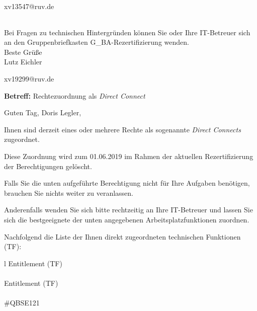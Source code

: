 \documentclass[a4paper,landscape,12pt]{letter}
\begin{document}
\begin{letter}{xv13547@ruv.de\hfill \break}
\begin{tiny}
\begin{longtable}{|p{35mm}|p{15mm}|p{25mm}|p{10mm}|p{40mm}|p{50mm}|p{50mm}|}
\hline
		\end{longtable}
		\end{tiny}
	
\begin{minipage}{\textwidth}
			Bei Fragen zu technischen Hintergründen können Sie 
			oder Ihre IT-Betreuer sich an den Gruppenbriefkasten 
			G\_BA-Rezertifizierung
			wenden.\\
			\linebreak
			Beste Grüße\\
			Lutz Eichler
	\end{minipage}
	\end{letter}
	
\begin{letter}{xv19299@ruv.de\hfill \break}
\begin{normalsize}
	\opening{\textbf{Betreff:} Rechtezuordnung als \emph{Direct Connect}}
	\begin{normalsize} \hfill
	\end{normalsize}

	\begin{normalsize}
		Guten Tag, 
	Doris Legler, \hfill \break
	\end{normalsize}
	\end{normalsize}
	
\begin{normalsize}
	Ihnen sind derzeit eines oder mehrere Rechte als sogenannte \emph{Direct Connects} zugeordnet.
	
	Diese Zuordnung wird zum 01.06.2019 im Rahmen der aktuellen Rezertifizierung der Berechtigungen gelöscht.
	
	Falls Sie die unten aufgeführte Berechtigung nicht für Ihre Aufgaben benötigen, 
	brauchen Sie nichts weiter zu veranlassen.
	
	Anderenfalls wenden Sie sich bitte rechtzeitig an Ihre IT-Betreuer 
	und lassen Sie sich die bestgeeignete der unten angegebenen Arbeitsplatzfunktionen zuordnen.
	\end{normalsize}
	
\begin{normalsize}
	Nachfolgend die Liste der Ihnen direkt zugeordneten technischen Funktionen (TF):

	\begin{longtable}{l}
		Entitlement (TF) \\ \hline
		\endfirsthead
		\\\hline
		Entitlement (TF) \\ \hline
		\endhead %
		\multicolumn{1}{r@{}}{Fortsetzung \ldots}\\
		\endfoot
		\hline
		\endlastfoot
	\#QBSE121\\
	\end{longtable}
	\end{normalsize}
	

\end{letter}
\end{document}
